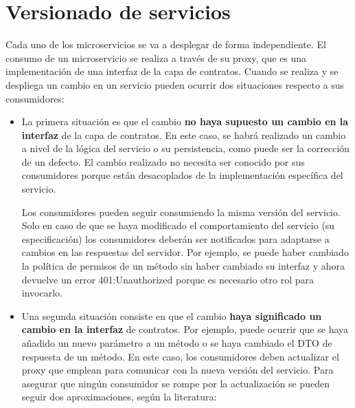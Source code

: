 \documentclass[11pt,spanish,listoffigures]{tfgetsinf}
\begin{document}
\newpage

\section{Versionado de servicios}

Cada uno de los microservicios se va a desplegar de forma independiente. El consumo de un microservicio se realiza a través de su proxy, que es una implementación de una interfaz de la capa de contratos. Cuando se realiza y se despliega un cambio en un servicio pueden ocurrir dos situaciones respecto a sus consumidores:

\begin{itemize}

\item  La primera situación es que el cambio \textbf{no haya supuesto un cambio en la interfaz} de la capa de contratos. En este caso, se habrá realizado un cambio a nivel de la lógica del servicio o su persistencia, como puede ser la corrección de un defecto. El cambio realizado no necesita ser conocido por sus consumidores porque están desacoplados de la implementación específica del servicio. 

Los consumidores pueden seguir consumiendo la misma versión del servicio. Solo en caso de que se haya modificado el comportamiento del servicio (su especificación) los consumidores deberán ser notificados para adaptarse a cambios en las respuestas del servidor. Por ejemplo, se puede haber cambiado la política de permisos de un método sin haber cambiado su interfaz y ahora devuelve un error 401:Unauthorized porque es necesario otro rol para invocarlo.

\item Una segunda situación consiste en que el cambio \textbf{haya significado un cambio en la interfaz} de contratos. Por ejemplo, puede ocurrir que se haya añadido un nuevo parámetro a un método o se haya cambiado el DTO de respuesta de un método. En este caso, los consumidores deben actualizar el proxy que emplean para comunicar con la nueva versión del servicio. Para asegurar que ningún consumidor se rompe por la actualización se pueden seguir dos aproximaciones, según la literatura:

\begin{itemize}


\end{itemize}
\end{itemize}
\end{document}
